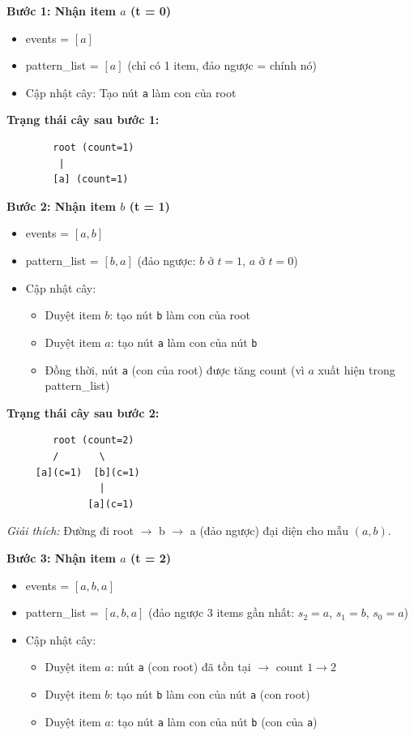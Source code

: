 \documentclass[14pt,a4paper,oneside]{extreport}
\begin{document}
\vspace{1em}
\noindent\textbf{Bước 1: Nhận item $a$ (t = 0)}

\begin{itemize}
    \item events = $[a]$
    \item pattern\_list = $[a]$ (chỉ có 1 item, đảo ngược = chính nó)
    \item Cập nhật cây: Tạo nút \texttt{a} làm con của root
\end{itemize}

\textbf{Trạng thái cây sau bước 1:}
\begin{verbatim}
        root (count=1)
         |
        [a] (count=1)
\end{verbatim}

\vspace{1em}
\noindent\textbf{Bước 2: Nhận item $b$ (t = 1)}

\begin{itemize}
    \item events = $[a, b]$
    \item pattern\_list = $[b, a]$ (đảo ngược: $b$ ở $t=1$, $a$ ở $t=0$)
    \item Cập nhật cây:
    \begin{itemize}
        \item Duyệt item $b$: tạo nút \texttt{b} làm con của root
        \item Duyệt item $a$: tạo nút \texttt{a} làm con của nút \texttt{b}
        \item Đồng thời, nút \texttt{a} (con của root) được tăng count (vì $a$ xuất hiện trong pattern\_list)
    \end{itemize}
\end{itemize}

\textbf{Trạng thái cây sau bước 2:}
\begin{verbatim}
        root (count=2)
        /       \
     [a](c=1)  [b](c=1)
                |
              [a](c=1)
\end{verbatim}

\textit{Giải thích:} Đường đi root $\rightarrow$ b $\rightarrow$ a (đảo ngược) đại diện cho mẫu $(a, b)$.

\vspace{1em}
\noindent\textbf{Bước 3: Nhận item $a$ (t = 2)}

\begin{itemize}
    \item events = $[a, b, a]$
    \item pattern\_list = $[a, b, a]$ (đảo ngược 3 items gần nhất: $s_2=a$, $s_1=b$, $s_0=a$)
    \item Cập nhật cây:
    \begin{itemize}
        \item Duyệt item $a$: nút \texttt{a} (con root) đã tồn tại $\rightarrow$ count $1 \rightarrow 2$
        \item Duyệt item $b$: tạo nút \texttt{b} làm con của nút \texttt{a} (con root)
        \item Duyệt item $a$: tạo nút \texttt{a} làm con của nút \texttt{b} (con của \texttt{a})
    \end{itemize}
\end{itemize}
\end{document}
